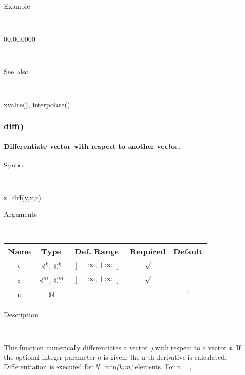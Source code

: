 \begin{description}
\item [Example]~
\end{description}
\begin{lyxlist}{00.00.0000}
\item [\texttt{y=yvalue(f,1)}.]~
\end{lyxlist}
\begin{description}
\item [See~also]~
\end{description}
\textcolor{blue}{\hyperlink{xvalue}{xvalue()}}\textcolor{black}{,}
\textcolor{blue}{\hyperlink{interpolate}{interpolate()}}


\newpage
{}


\subsubsection*{\hypertarget{diff}{}{\Large diff()}}


\paragraph{\label{par:Differentiate}Differentiate vector with respect to another
vector.}

\begin{description}
\item [Syntax]~
\end{description}
z=diff(y,x,n)

\begin{description}
\item [Arguments]~
\end{description}
\begin{tabular}{|c|c|c|c|c|}
\hline 
Name&
Type&
Def. Range&
Required&
Default\tabularnewline
\hline
\hline 
y&
$\mathbb{R}^{k}$, $\mathbb{C}^{k}$&
$\left]-\infty,+\infty\right[$&
$\surd$&
\tabularnewline
\hline 
x&
$\mathbb{R}^{m}$, $\mathbb{C}^{m}$&
$\left]-\infty,+\infty\right[$&
$\surd$&
\tabularnewline
\hline 
n&
$\mathbb{N}$&
&
&
1\tabularnewline
\hline
\end{tabular}

\begin{description}
\item [Description]~
\end{description}
This function numerically differentiates a vector \textit{y} with
respect to a vector \textit{x}. If the optional integer parameter
\textit{n} is given, the n-th derivative is calculated. Differentiation
is executed for \textit{N=}min\textit{(k,m)} elements. For n=1,

